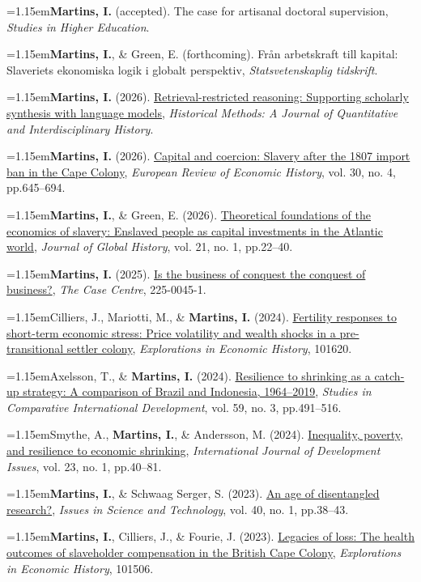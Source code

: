 \documentclass[11pt,a4paper]{article}
\newcommand{\cvlistitem}[1]{\par\addvspace{5pt}\noindent
  \textcolor{accent}{\raisebox{.45ex}{\rule{3.2pt}{3.2pt}}}\hspace{7pt}%
  \begin{minipage}[t]{\dimexpr\linewidth-12pt\relax}\hangindent=1.15em\hangafter=1\relax #1\par\end{minipage}\par}
\begin{document}
\cvlistitem{\textbf{Martins, I.} (accepted). The case for artisanal doctoral supervision, \textit{Studies in Higher Education}.}
\smallskip
\cvlistitem{\textbf{Martins, I.}, \& Green, E. (forthcoming). Från arbetskraft till kapital: Slaveriets ekonomiska logik i globalt perspektiv, \textit{Statsvetenskaplig tidskrift}.}
\smallskip
\cvlistitem{\textbf{Martins, I.} (2026). \href{https://doi.org/10.1080/01615440.2026.2762836}{Retrieval-restricted reasoning: Supporting scholarly synthesis with language models}, \textit{Historical Methods: A Journal of Quantitative and Interdisciplinary History}.}
\smallskip
\cvlistitem{\textbf{Martins, I.} (2026). \href{https://doi.org/10.1093/ereh/heag012}{Capital and coercion: Slavery after the 1807 import ban in the Cape Colony}, \textit{European Review of Economic History}, vol. 30, no. 4, pp.645--694.}
\smallskip
\cvlistitem{\textbf{Martins, I.}, \& Green, E. (2026). \href{https://doi.org/10.1017/S1740022825100296}{Theoretical foundations of the economics of slavery: Enslaved people as capital investments in the Atlantic world}, \textit{Journal of Global History}, vol. 21, no. 1, pp.22--40.}
\smallskip
\cvlistitem{\textbf{Martins, I.} (2025). \href{https://www.thecasecentre.org/products/view?id=208126}{Is the business of conquest the conquest of business?}, \textit{The Case Centre}, 225-0045-1.}
\smallskip
\cvlistitem{Cilliers, J., Mariotti, M., \& \textbf{Martins, I.} (2024). \href{https://doi.org/10.1016/j.eeh.2024.101620}{Fertility responses to short-term economic stress: Price volatility and wealth shocks in a pre-transitional settler colony}, \textit{Explorations in Economic History}, 101620.}
\smallskip
\cvlistitem{Axelsson, T., \& \textbf{Martins, I.} (2024). \href{https://doi.org/10.1007/s12116-023-09392-1}{Resilience to shrinking as a catch-up strategy: A comparison of Brazil and Indonesia, 1964--2019}, \textit{Studies in Comparative International Development}, vol. 59, no. 3, pp.491--516.}
\smallskip
\cvlistitem{Smythe, A., \textbf{Martins, I.}, \& Andersson, M. (2024). \href{https://doi.org/10.1108/IJDI-06-2023-0168}{Inequality, poverty, and resilience to economic shrinking}, \textit{International Journal of Development Issues}, vol. 23, no. 1, pp.40--81.}
\smallskip
\cvlistitem{\textbf{Martins, I.}, \& Schwaag Serger, S. (2023). \href{https://doi.org/10.58875/WBCQ3772}{An age of disentangled research?}, \textit{Issues in Science and Technology}, vol. 40, no. 1, pp.38--43.}
\smallskip
\cvlistitem{\textbf{Martins, I.}, Cilliers, J., \& Fourie, J. (2023). \href{https://doi.org/10.1016/j.eeh.2022.101506}{Legacies of loss: The health outcomes of slaveholder compensation in the British Cape Colony}, \textit{Explorations in Economic History}, 101506.}
\end{document}
